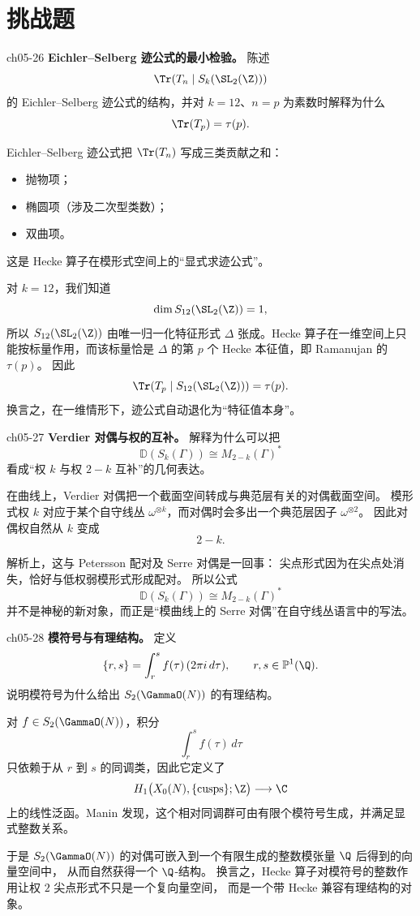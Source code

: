 \section{挑战题 \hard}

\begin{problem}{ch05-26}
\textbf{Eichler--Selberg 迹公式的最小检验。}
陈述
\[
\Tr(T_n\mid S_k(\SL_2(\Z)))
\]
的 Eichler--Selberg 迹公式的结构，并对 $k=12$、$n=p$ 为素数时解释为什么
\[
\Tr(T_p)=\tau(p).
\]
\end{problem}
\begin{solution}
Eichler--Selberg 迹公式把 $\Tr(T_n)$ 写成三类贡献之和：
\begin{itemize}
  \item 抛物项；
  \item 椭圆项（涉及二次型类数）；
  \item 双曲项。
\end{itemize}
这是 Hecke 算子在模形式空间上的“显式求迹公式”。

对 $k=12$，我们知道
\[
\dim S_{12}(\SL_2(\Z))=1,
\]
所以 $S_{12}(\SL_2(\Z))$ 由唯一归一化特征形式 $\Delta$ 张成。Hecke 算子在一维空间上只能按标量作用，而该标量恰是 $\Delta$ 的第 $p$ 个 Hecke 本征值，即 Ramanujan 的 $\tau(p)$。
因此
\[
\Tr(T_p\mid S_{12}(\SL_2(\Z)))=\tau(p).
\]
换言之，在一维情形下，迹公式自动退化为“特征值本身”。
\end{solution}

\begin{problem}{ch05-27}
\textbf{Verdier 对偶与权的互补。}
解释为什么可以把
\[
\mathbb D(S_k(\Gamma))\cong M_{2-k}(\Gamma)^*
\]
看成“权 $k$ 与权 $2-k$ 互补”的几何表达。
\end{problem}
\begin{solution}
在曲线上，Verdier 对偶把一个截面空间转成与典范层有关的对偶截面空间。
模形式权 $k$ 对应于某个自守线丛 $\omega^{\otimes k}$，而对偶时会多出一个典范层因子 $\omega^{\otimes 2}$。
因此对偶权自然从 $k$ 变成
\[
2-k.
\]

解析上，这与 Petersson 配对及 Serre 对偶是一回事：
尖点形式因为在尖点处消失，恰好与低权弱模形式形成配对。
所以公式
\[
\mathbb D(S_k(\Gamma))\cong M_{2-k}(\Gamma)^*
\]
并不是神秘的新对象，而正是“模曲线上的 Serre 对偶”在自守线丛语言中的写法。
\end{solution}

\begin{problem}{ch05-28}
\textbf{模符号与有理结构。}
定义
\[
\{r,s\}=\int_r^s f(\tau)\,(2\pi i\,d\tau),\qquad r,s\in\mathbb P^1(\Q).
\]
说明模符号为什么给出 $S_2(\GammaO(N))$ 的有理结构。
\end{problem}
\begin{solution}
对 $f\in S_2(\GammaO(N))$，积分
\[
\int_r^s f(\tau)\,d\tau
\]
只依赖于从 $r$ 到 $s$ 的同调类，因此它定义了
\[
H_1\bigl(X_0(N),\{\text{cusps}\};\Z\bigr)\longrightarrow \C
\]
上的线性泛函。Manin 发现，这个相对同调群可由有限个模符号生成，并满足显式整数关系。

于是 $S_2(\GammaO(N))$ 的对偶可嵌入到一个有限生成的整数模张量 $\Q$ 后得到的向量空间中，
从而自然获得一个 $\Q$-结构。
换言之，Hecke 算子对模符号的整数作用让权 $2$ 尖点形式不只是一个复向量空间，
而是一个带 Hecke 兼容有理结构的对象。
\end{solution}

